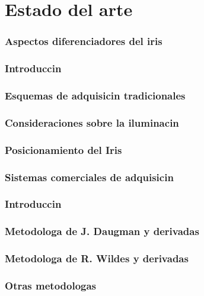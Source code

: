 \chapter{Estado del arte}
\label{chap:estadodelarte}


 \label{sec:historia}

\label{sec:anatomiaojo}
\subsection{Aspectos diferenciadores del iris}


 \label{sec:adquisicion}
\subsection{Introduccin}
\subsection{Esquemas de adquisicin tradicionales}
\subsection{Consideraciones sobre la iluminacin}
\label{subsec:iluminacion}
\subsection{Posicionamiento del Iris}
\subsection{Sistemas comerciales de adquisicin}


 \label{sec:localizacion}
\subsection{Introduccin}
\subsection{Metodologa de J. Daugman y derivadas}
\subsection{Metodologa de R. Wildes y derivadas}
\subsection{Otras metodologas}
